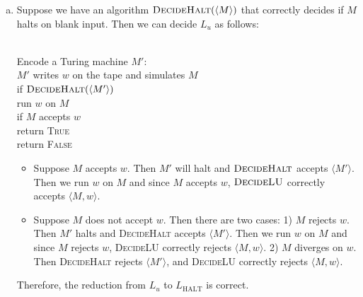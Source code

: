 \documentclass[11pt]{article}
\begin{document}
\begin{solution}
\begin{enumerate}[(a)]
\item Suppose we have an algorithm $\textsc{DecideHalt}(\langle M \rangle)$ that correctly decides if $M$ halts on blank input. Then we can decide $L_u$ as follows:
\begin{algo}
	\+
\\	Encode a Turing machine $M'$:\+
\\	$M'$ writes $w$ on the tape and simulates $M$\-
\\	if $\textsc{DecideHalt}(\langle M' \rangle)$\+
\\	run $w$ on $M$
\\	if $M$ accepts $w$\+
\\	return \textsc{True}\-\-
\\	return \textsc{False}\-
\end{algo}
\begin{itemize}
\item Suppose $M$ accepts $w$. Then $M'$ will halt and $\textsc{DecideHalt}$ accepts $\langle M' \rangle$. Then we run $w$ on $M$ and since $M$ accepts $w$, $\textsc{DecideLU}$ correctly accepts $\langle M,w \rangle$.
\item Suppose $M$ does not accept $w$. Then there are two cases: 1) $M$ rejects $w$. Then $M'$ halts and \textsc{DecideHalt} accepts  $\langle M' \rangle$. Then we run $w$ on $M$ and since $M$ rejects $w$, \textsc{DecideLU} correctly rejects $\langle M,w \rangle$. 2) $M$ diverges on $w$. Then \textsc{DecideHalt} rejects $\langle M' \rangle$, and \textsc{DecideLU} correctly rejects $\langle M,w \rangle$.
\end{itemize}
Therefore, the reduction from $L_u$ to $L_{\text{HALT}}$ is correct.


\end{enumerate}
\end{solution}
\end{document}
